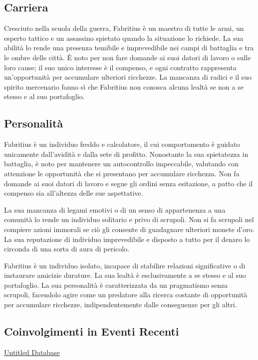 \subsection{Carriera}\label{carriera}


Cresciuto nella scuola della guerra, Fabritius è un maestro di tutte le
armi, un esperto tattico e un assassino spietato quando la situazione lo
richiede. La sua abilità lo rende una presenza temibile e imprevedibile
nei campi di battaglia e tra le ombre delle città. È noto per non fare
domande ai suoi datori di lavoro o sulle loro cause; il suo unico
interesse è il compenso, e ogni contratto rappresenta un'opportunità per
accumulare ulteriori ricchezze. La mancanza di radici e il suo spirito
mercenario fanno sì che Fabritius non conosca alcuna lealtà se non a se
stesso e al suo portafoglio.

\subsection{Personalità}\label{personalituxe0}


Fabritius è un individuo freddo e calcolatore, il cui comportamento è
guidato unicamente dall'avidità e dalla sete di profitto. Nonostante la
sua spietatezza in battaglia, è noto per mantenere un autocontrollo
impeccabile, valutando con attenzione le opportunità che si presentano
per accumulare ricchezza. Non fa domande ai suoi datori di lavoro e
segue gli ordini senza esitazione, a patto che il compenso sia
all'altezza delle sue aspettative.

La sua mancanza di legami emotivi o di un senso di appartenenza a una
comunità lo rende un individuo solitario e privo di scrupoli. Non si fa
scrupoli nel compiere azioni immorali se ciò gli consente di guadagnare
ulteriori monete d'oro. La sua reputazione di individuo imprevedibile e
disposto a tutto per il denaro lo circonda di una sorta di aura di
pericolo.

Fabritius è un individuo isolato, incapace di stabilire relazioni
significative o di instaurare amicizie durature. La sua lealtà è
esclusivamente a se stesso e al suo portafoglio. La sua personalità è
caratterizzata da un pragmatismo senza scrupoli, facendolo agire come un
predatore alla ricerca costante di opportunità per accumulare ricchezze,
indipendentemente dalle conseguenze per gli altri.

\subsection{Coinvolgimenti in Eventi
Recenti}\label{coinvolgimenti-in-eventi-recenti}


\href{Untitled\%20Database\%20cce7df74e0604fb88db6fb1d13af3934.csv}{Untitled
Database}

